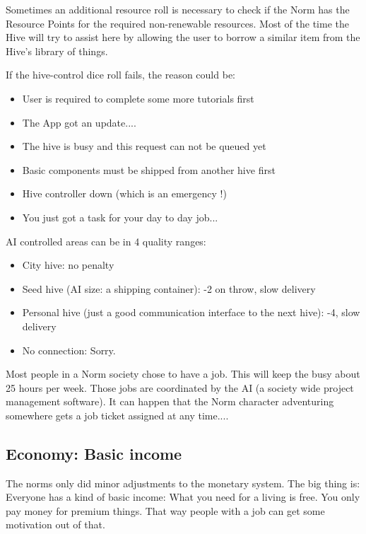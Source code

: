 Sometimes an additional resource roll is necessary to check if the Norm has the Resource Points for the required non-renewable resources. Most of the time the Hive will try to assist here by allowing the user to borrow a similar item from the Hive's library of things.

If the hive-control dice roll fails, the reason could be:
\begin{itemize}
    \item User is required to complete some more tutorials first
    \item The App got an update....
    \item The hive is busy and this request can not be queued yet
    \item Basic components must be shipped from another hive first
    \item Hive controller down (which is an emergency !)
    \item You just got a task for your day to day job...
\end{itemize}

AI controlled areas can be in 4 quality ranges:

\begin{itemize}
    \item City hive: no penalty
    \item Seed hive (AI size: a shipping container): -2 on throw, slow delivery
    \item Personal hive (just a good communication interface to the next hive): -4, slow delivery
    \item No connection: Sorry.
\end{itemize}

Most people in a Norm society chose to have a job. This will keep the busy about 25 hours per week. Those jobs are coordinated by the AI (a society wide project management software). It can happen that the Norm character adventuring somewhere gets a job ticket assigned at any time....

\subsection{Economy: Basic income}
\label{sec:basic income}

The norms only did minor adjustments to the monetary system. The big thing is: Everyone has a kind of basic income: What you need for a living is free.
You only pay money for premium things. That way people with a job can get some motivation out of that.

